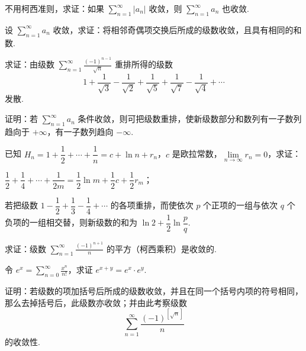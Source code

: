 \begin{xiti}
\item 不用柯西准则，求证：如果 $\displaystyle\sum_{n=1}^{\infty}|a_{n}|$ 收敛，则 $\sum_{n=1}^{\infty}a_{n}$ 也收敛.
\item 设 $\displaystyle\sum_{n=1}^{\infty}a_{n}$ 收敛，求证：将相邻奇偶项交换后所成的级数收敛，且具有相同的和数.
\item 求证：由级数 $\displaystyle\sum_{n=1}^{\infty}\frac{(-1)^{n-1}}{\sqrt{n}}$ 重排所得的级数
\[
1+\frac{1}{\sqrt{3}}-\frac{1}{\sqrt{2}}+\frac{1}{\sqrt{5}}+\frac{1}{\sqrt{7}}-\frac{1}{\sqrt{4}}+\cdots
\]
发散.
\item 证明：若 $\displaystyle\sum_{n=1}^{\infty}a_{n}$ 条件收敛，则可把级数重排，使新级数部分和数列有一子数列趋向于 $+\infty$，有一子数列趋向 $-\infty$.
\item 已知 $H_{n}=1+\dfrac{1}{2}+\cdots+\dfrac{1}{n}=c+\ln n+r_{n}$，$c$ 是欧拉常数，$\lim\limits_{n\to\infty}r_{n}=0$，求证：
\begin{ziti}
\item $\dfrac{1}{2}+\dfrac{1}{4}+\cdots+\dfrac{1}{2m}=\dfrac{1}{2}\ln m+\dfrac{1}{2}c+\dfrac{1}{2}r_{m}$；
\item 若把级数 $1-\dfrac{1}{2}+\dfrac{1}{3}-\dfrac{1}{4}+\cdots$ 的各项重排，而使依次 $p$ 个正项的一组与依次 $q$ 个负项的一组相交替，则新级数的和为 $\ln 2+\dfrac{1}{2}\ln\dfrac{p}{q}$.
\end{ziti}
\item 求证：级数 $\displaystyle\sum_{n=1}^{\infty}\frac{(-1)^{n+1}}{n}$ 的平方（柯西乘积）是收敛的.
\item 令 $\displaystyle e^{x}=\sum_{n=0}^{\infty}\frac{x^{n}}{n!}$，求证 $e^{x+y}=e^{x}\cdot e^{y}$.
\item 证明：若级数的项加括号后所成的级数收敛，并且在同一个括号内项的符号相同，那么去掉括号后，此级数亦收敛；并由此考察级数
\[
\sum_{n=1}^{\infty}\frac{(-1)^{[\sqrt{n}]}}{n}
\]
的收敛性.
\end{xiti}